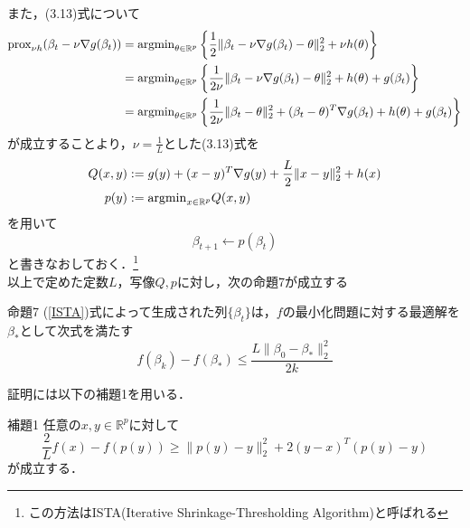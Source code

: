 \documentclass{jsarticle}
\theoremstyle{definition}
\theoremstyle{mystyle} %
\begin{document}
また，(3.13)式について
\begin{align*}
{\rm prox}_{\nu h}(\beta_t - \nu \nabla g(\beta_t))&= {\rm argmin}_{\theta\in \mathbb{R}^p}\left\{\frac{1}{2}\|\beta_t-\nu \nabla g(\beta_t)-\theta\|_2^2+\nu h(\theta)\right\}\\
&={\rm argmin}_{\theta\in \mathbb{R}^p}\left\{\frac{1}{2\nu}\|\beta_t-\nu \nabla g(\beta_t)-\theta\|_2^2+ h(\theta)+g(\beta_t)\right\}\\
&={\rm argmin}_{\theta\in \mathbb{R}^p}\left\{\frac{1}{2\nu}\|\beta_t-\theta\|_2^2+ (\beta_t-\theta)^T\nabla g(\beta_t)+h(\theta)+g(\beta_t)\right\}
\end{align*}
が成立することより，$\nu =\displaystyle\frac{1}{L}$とした(3.13)式を
\begin{align*}
Q(x,y)&:=g(y)+(x-y)^T\nabla g(y)+\frac{L}{2}\|x-y\|_2^2 +h(x)\\
p(y)&:={\rm argmin}_{x\in \mathbb{R}^p}Q(x,y)
\end{align*}
を用いて
\begin{equation}
\label{ISTA}
\beta_{t+1}\leftarrow p(\beta_t)
\end{equation}
と書きなおしておく．\footnote{この方法はISTA(Iterative Shrinkage-Thresholding Algorithm)と呼ばれる}\\

以上で定めた定数$L$，写像$Q,p$に対し，次の命題7が成立する
\begin{itembox}[l]{命題7}
(\ref{ISTA})式によって生成された列$\{\beta_t\}$は，$f$の最小化問題に対する最適解を$\beta_{\ast}$として次式を満たす
$$f(\beta_k)-f(\beta_{\ast})\leq \frac{L\|\beta_0-\beta_{\ast}\|_2^2}{2k}$$
\end{itembox}
証明には以下の補題1を用いる．
\begin{itembox}[l]{補題1}
任意の$x,y\in \mathbb{R}^p$に対して
$$\frac{2}{L}f(x)-f(p(y))\geq \|p(y)-y\|_2^2+2(y-x)^T(p(y)-y)$$
が成立する．
\end{itembox}
\end{document}
